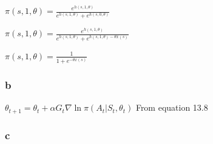\documentclass[11pt]{article}
\begin{document}
    \noindent $ \pi(s, 1, \theta) = \frac{e^{h(s,1, \theta)}}{e^{h(s,1, \theta)} + e^{h(s,0, \theta)}} $

    \noindent $ \pi(s, 1, \theta) = \frac{e^{h(s,1, \theta)}}{e^{h(s,1, \theta)} + e^{h(s,1, \theta)-\theta x(s)}} $

    \noindent $ \pi(s, 1, \theta) = \frac{1}{1 + e^{-\theta x(s)}} $


    \subsubsection*{b}

    \noindent $ \theta_{t+1} = \theta_t + \alpha G_t \nabla \ln \pi(A_t | S_t, \theta_t) $ \hfill From equation 13.8

    \subsubsection*{c}
\end{document}
